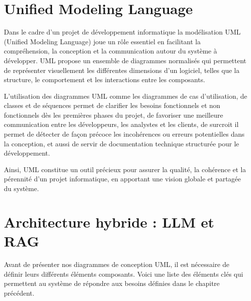 \documentclass[12pt,a4paper]{report}
\begin{document}
	\section{Unified Modeling Language}
	
	Dans le cadre d’un projet de développement informatique la modélisation UML (Unified Modeling Language) joue un rôle essentiel en facilitant la compréhension, la conception et la communication autour du système à développer. UML propose un ensemble de diagrammes normalisés qui permettent de représenter visuellement les différentes dimensions d’un logiciel, telles que la structure, le comportement et les interactions entre les composants.
	
	L’utilisation des diagrammes UML comme les diagrammes de cas d’utilisation, de classes et de séquences permet de clarifier les besoins fonctionnels et non fonctionnels dès les premières phases du projet, de favoriser une meilleure communication entre les développeurs, les analystes et les clients, de surcroit il permet de détecter de façon précoce les incohérences ou erreurs potentielles dans la conception, et aussi de servir de documentation technique structurée pour le développement.
	
	Ainsi, UML constitue un outil précieux pour assurer la qualité, la cohérence et la pérennité d’un projet informatique, en apportant une vision globale et partagée du système.
	
	\section{Architecture hybride : LLM et RAG}
	
	Avant de présenter nos diagrammes de conception UML, il est nécessaire de définir leurs différents éléments composants. Voici une liste des éléments clés qui permettent au système de répondre aux besoins définies dans le chapitre précédent.
	
\end{document}
